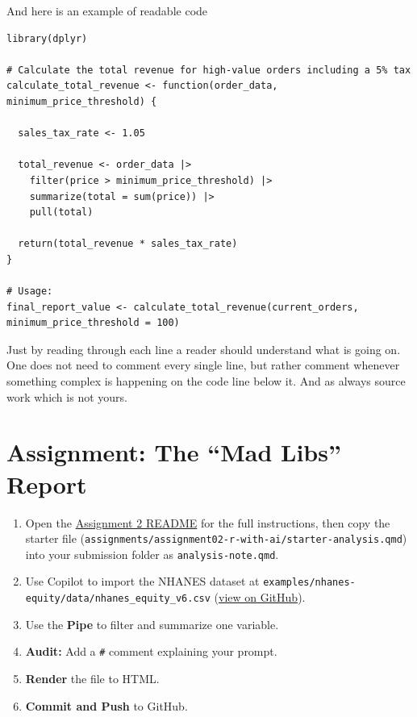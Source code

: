 \documentclass[
  letterpaper,
  DIV=11,
  numbers=noendperiod,
  oneside]{scrreprt}
\begin{document}
And here is an example of readable code

\begin{verbatim}
library(dplyr)

# Calculate the total revenue for high-value orders including a 5% tax
calculate_total_revenue <- function(order_data, minimum_price_threshold) {
  
  sales_tax_rate <- 1.05
  
  total_revenue <- order_data |>
    filter(price > minimum_price_threshold) |>
    summarize(total = sum(price)) |>
    pull(total)
  
  return(total_revenue * sales_tax_rate)
}

# Usage:
final_report_value <- calculate_total_revenue(current_orders, minimum_price_threshold = 100)
\end{verbatim}

Just by reading through each line a reader should understand what is
going on. One does not need to comment every single line, but rather
comment whenever something complex is happening on the code line below
it. And as always source work which is not yours.

\chapter{Assignment: The ``Mad Libs''
Report}\label{assignment-the-mad-libs-report-1}

\begin{enumerate}
\def\labelenumi{\arabic{enumi}.}
\item
  Open the
  \href{../../assignments/assignment02-r-with-ai/README.md}{Assignment 2
  README} for the full instructions, then copy the starter file
  (\texttt{assignments/assignment02-r-with-ai/starter-analysis.qmd})
  into your submission folder as \texttt{analysis-note.qmd}.
\item
  Use Copilot to import the NHANES dataset at
  \texttt{examples/nhanes-equity/data/nhanes\_equity\_v6.csv}
  (\href{https://github.com/ehsanx/HDSx/blob/main/examples/nhanes-equity/data/nhanes_equity_v6.csv}{view
  on GitHub}).
\item
  Use the \textbf{Pipe} to filter and summarize one variable.
\item
  \textbf{Audit:} Add a \texttt{\#} comment explaining your prompt.
\item
  \textbf{Render} the file to HTML.
\item
  \textbf{Commit and Push} to GitHub.
\end{enumerate}
\end{document}
